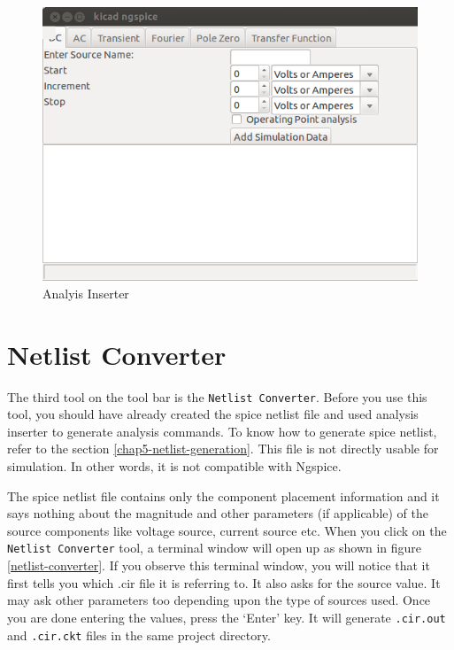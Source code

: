 \begin{figure}
\begin{center}
\includegraphics[width=0.8\linewidth]{figures/analysis-inserter.png}
\caption{Analyis Inserter}
\label{analyis-inserter}
\end{center}
\end{figure}

\section{Netlist Converter}\label{subsec-netlist-converter}

The third tool on the tool bar is the {\tt Netlist Converter}. Before you use this tool, you should have already created the spice netlist file and used analysis inserter to generate analysis commands. To know how to generate spice netlist, refer to the section \ref{chap5-netlist-generation}. This file is not directly usable for simulation. In other words, it is not compatible with Ngspice.

 The spice netlist file contains only the component placement information and it says nothing about the magnitude and other parameters (if applicable) of the source components like voltage source, current source etc. When you click on the {\tt Netlist Converter} tool, a terminal window will open up as shown in figure \ref{netlist-converter}. If you observe this terminal window, you will notice that it first tells you which .cir file it is referring to. It also asks for the source value. It may ask other parameters too depending upon the type of sources used. Once you are done entering the values, press the `Enter' key. It will generate {\tt .cir.out} and {\tt .cir.ckt} files in the same project directory.


